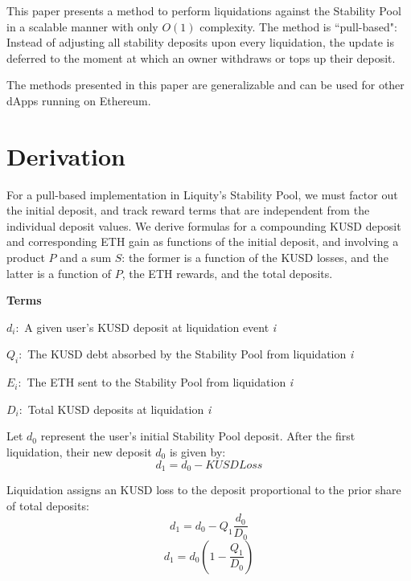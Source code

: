 \documentclass[reqno]{article}
\begin{document}
This paper presents a method to perform liquidations against the Stability Pool in a scalable manner with only $O(1)$ complexity. The method is ``pull-based": Instead of adjusting all stability deposits upon every liquidation, the update is deferred to the moment at which an owner withdraws or tops up their deposit.

The methods presented in this paper are generalizable and can be used for other dApps running on Ethereum.

\section{Derivation}
For a pull-based implementation in Liquity’s Stability Pool, we must factor out the initial deposit, and track reward terms that are independent from the individual deposit values. We derive formulas for a compounding KUSD deposit and corresponding ETH gain as functions of the initial deposit, and involving a product $P$ and a sum $S$: the former is a function of the KUSD losses, and the latter is a function of $P$, the ETH rewards, and the total deposits.

\bigskip
\raggedright %

\textbf{Terms}
\begin{terms}
    \item $d_i:$ A given user’s KUSD deposit at liquidation event \textit{i}\\
    \item $Q_i:$ The KUSD debt absorbed by the Stability Pool from liquidation \textit{i}\\
    \item $E_i:$ The ETH sent to the Stability Pool from liquidation \textit{i}\\
    \item $D_i:$ Total KUSD deposits at liquidation \textit{i}
\end{terms}

\bigskip
Let $d_0$ represent the user’s initial Stability Pool deposit. After the first liquidation, their new
deposit $d_0$ is given by:\\
\begin{equation} 
    d_1=d_0-KUSDLoss
\end{equation}

\bigskip
Liquidation assigns an KUSD loss to the deposit proportional to the prior share of total deposits:
\begin{equation} \label{eq:2}
    d_1=d_0-Q_1\frac{d_0}{D_0}
\end{equation}
\begin{equation} 
    d_1=d_0\left(1-\frac{Q_1}{D_0}\right)
\end{equation}
\end{document}
